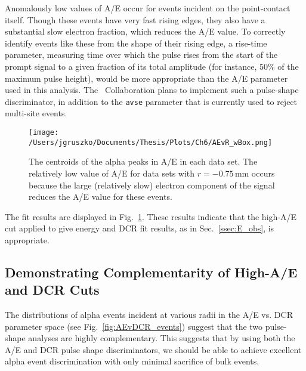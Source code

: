 Anomalously low values of A/E occur for events incident on the point-contact itself. Though these events have very fast rising edges, they also have a substantial slow electron fraction, which reduces the A/E value. To correctly identify events like these from the shape of their rising edge, a rise-time parameter, measuring time over which the pulse rises from the start of the prompt signal to a given fraction of its total amplitude (for instance, 50\% of the maximum pulse height), would be more appropriate than the A/E parameter used in this analysis. The \MJ\ Collaboration plans to implement such a pulse-shape discriminator, in addition to the {\tt avse} parameter that is currently used to reject multi-site events.

\begin{figure}[t]
 \centering
 \texttt{[image: /Users/jgruszko/Documents/Thesis/Plots/Ch6/AEvR\_wBox.png]}
 \caption[The results of fits to A/E in each data set]{The centroids of the alpha peaks in A/E in each data set. The relatively low value of A/E for data sets with $r=-0.75$\,mm occurs because the large (relatively slow) electron component of the signal reduces the A/E value for these events.} 
 \label{fig:AEfit_mu}
\end{figure}

The fit results are displayed in Fig.~\ref{fig:AEfit_mu}. These results indicate that the high-A/E cut applied to give energy and DCR fit results,  as in Sec.~\ref{ssec:E_obs}, is appropriate.


\subsection{Demonstrating Complementarity of High-A/E and DCR Cuts}
The distributions of alpha events incident at various radii in the A/E vs. DCR parameter space (see Fig.~\ref{fig:AEvDCR_events}) suggest that the two pulse-shape analyses are highly complementary. This suggests that by using both the A/E and DCR pulse shape discriminators, we should be able to achieve excellent alpha event discrimination with only minimal sacrifice of bulk events. 


